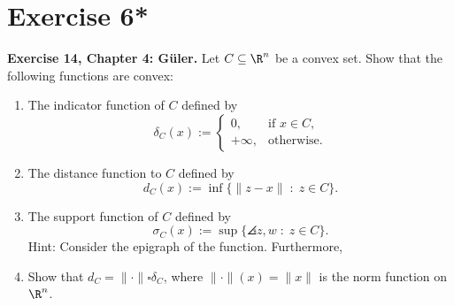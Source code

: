 
\section*{Exercise 6*}

\textbf{Exercise 14, Chapter 4: Güler.} Let $C \subseteq \R^{n}$ be a convex set. Show that the following functions are convex:

\begin{enumerate}[label=(\alph*)]
    \item The indicator function of $C$ defined by
    \[ \delta_C(x) := \begin{cases}
        0, & \mbox{if $x\in C$},\\
        +\infty,& \mbox{otherwise}.
    \end{cases} \]
    \item The distance function to $C$ defined by
    \[ d_C(x) := \inf \{\|z-x\| \;:\; z \in C\}. \]
    \item The support function of $C$ defined by
    \[ \sigma_C(x) := \sup\{\angles{z,w} \;:\; z\in C \}. \]
    Hint: Consider the epigraph of the function. Furthermore,
    \item Show that $d_C = \|\cdot\|\square \delta_C$, where $\|\cdot\|(x) = \|x\|$ is the norm function on $\R^n$.
\end{enumerate}